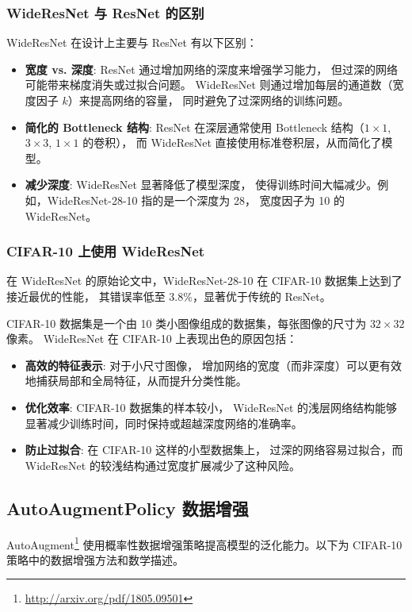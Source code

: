 \documentclass[12pt, a4paper, oneside]{ctexart}
\numberwithin{equation}{section}  %
\begin{document}
\subsubsection{WideResNet 与 ResNet 的区别}

WideResNet 在设计上主要与 ResNet 有以下区别：
\begin{itemize}
    \item \textbf{宽度 vs. 深度}: ResNet 通过增加网络的深度来增强学习能力，
    但过深的网络可能带来梯度消失或过拟合问题。
    WideResNet 则通过增加每层的通道数（宽度因子 $k$）来提高网络的容量，
    同时避免了过深网络的训练问题。
    \item \textbf{简化的 Bottleneck 结构}: ResNet 在深层通常使用 Bottleneck 
    结构（$1\times1$, $3\times3$, $1\times1$ 的卷积），
    而 WideResNet 直接使用标准卷积层，从而简化了模型。
    \item \textbf{减少深度}: WideResNet 显著降低了模型深度，
    使得训练时间大幅减少。例如，WideResNet-28-10 指的是一个深度为 28，
    宽度因子为 10 的 WideResNet。
\end{itemize}

\subsubsection{CIFAR-10 上使用 WideResNet}
在 WideResNet 的原始论文中，WideResNet-28-10 在 CIFAR-10 数据集上达到了接近最优的性能，
其错误率低至 3.8\%，显著优于传统的 ResNet。

CIFAR-10 数据集是一个由 10 类小图像组成的数据集，每张图像的尺寸为 $32\times32$ 像素。
WideResNet 在 CIFAR-10 上表现出色的原因包括：
\begin{itemize}
    \item \textbf{高效的特征表示}: 对于小尺寸图像，
    增加网络的宽度（而非深度）可以更有效地捕获局部和全局特征，从而提升分类性能。
    \item \textbf{优化效率}: CIFAR-10 数据集的样本较小，
    WideResNet 的浅层网络结构能够显著减少训练时间，同时保持或超越深度网络的准确率。
    \item \textbf{防止过拟合}: 在 CIFAR-10 这样的小型数据集上，
    过深的网络容易过拟合，而 WideResNet 的较浅结构通过宽度扩展减少了这种风险。
\end{itemize}

\subsection{AutoAugmentPolicy 数据增强}

AutoAugment\footnote{\url{http://arxiv.org/pdf/1805.09501}} 
使用概率性数据增强策略提高模型的泛化能力。以下为 CIFAR-10 策略中的数据增强方法和数学描述。
\end{document}
